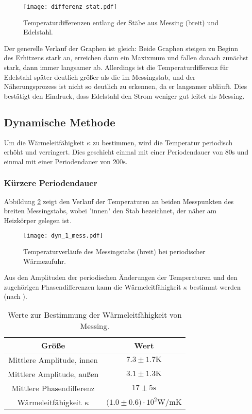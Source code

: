   \begin{figure}
    \centering
    \texttt{[image: differenz\_stat.pdf]}
    \caption{Temperaturdifferenzen entlang der Stäbe aus Messing (breit) und Edelstahl.}
    \label{fig:diffstat}
  \end{figure}
  \FloatBarrier
  \noindent Der generelle Verlauf der Graphen ist gleich: 
  Beide Graphen steigen zu Beginn des Erhitzens stark an, erreichen dann ein Maxixmum 
  und fallen danach zunächst stark, dann immer langsamer ab. Allerdings ist die Temperaturdifferenz für Edelstahl später deutlich größer als die im
  Messingstab, und der Näherungsprozess ist nicht so deutlich zu erkennen, da er langsamer abläuft. Dies bestätigt den Eindruck, dass Edelstahl den Strom
  weniger gut leitet als Messing.


\subsection{Dynamische Methode}
  Um die Wärmeleitfähigkeit $\kappa$ zu bestimmen, wird die Temperatur periodisch erhöht und verringert. Dies geschieht einmal mit einer
  Periodendauer von $80 \si{\s}$ und einmal mit einer Periodendauer von $200 \si{\s}$.

  \subsubsection{Kürzere Periodendauer}
  Abbildung \ref{fig:messingdyn} zeigt den Verlauf der Temperaturen an beiden Messpunkten des breiten Messingstabs, wobei "innen" den Stab bezeichnet, der näher 
  am Heizkörper gelegen ist. 

  \begin{figure} %
    \centering
    \texttt{[image: dyn\_1\_mess.pdf]}
    \caption{Temperaturverläufe des Messingstabs (breit) bei periodischer Wärmezufuhr.}
    \label{fig:messingdyn}
  \end{figure}

  \FloatBarrier

  \noindent Aus den Amplituden der periodischen Änderungen der Temperaturen und den zugehörigen Phasendifferenzen kann die Wärmeleitfähigkeit $\kappa$ bestimmt werden (nach ). %

  \begin{table}
    \centering
    \caption{Werte zur Bestimmung der Wärmeleitfähigkeit von Messing.}
    \label{tab:kappamess}
    \begin{tabular}{c c }
      \toprule
      Größe & Wert \\
      \midrule %
      Mittlere Amplitude, innen & $7.3 \pm 1.7 \si{\kelvin}$\\
      Mittlere Amplitude, außen & $3.1 \pm 1.3 \si{\kelvin}$\\
      Mittlere Phasendifferenz & $17 \pm 5 \si{\s}$ \\
      Wärmeleitfähigkeit $\kappa$ & $\bigl(1.0 \pm 0.6\bigr) \cdot 10^{2} \si{\watt\per\m\kelvin}$ \\ %
      \bottomrule
    \end{tabular}
  \end{table}

